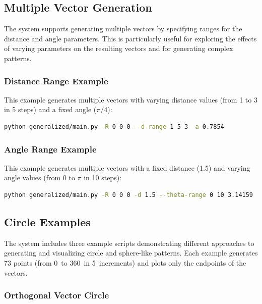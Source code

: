 \subsection{Multiple Vector Generation}

The system supports generating multiple vectors by specifying ranges for the distance and angle parameters. This is particularly useful for exploring the effects of varying parameters on the resulting vectors and for generating complex patterns.

\subsubsection{Distance Range Example}

This example generates multiple vectors with varying distance values (from 1 to 3 in 5 steps) and a fixed angle ($\pi/4$):

\begin{lstlisting}[language=bash]
python generalized/main.py -R 0 0 0 --d-range 1 5 3 -a 0.7854
\end{lstlisting}

\subsubsection{Angle Range Example}

This example generates multiple vectors with a fixed distance (1.5) and varying angle values (from 0 to $\pi$ in 10 steps):

\begin{lstlisting}[language=bash]
python generalized/main.py -R 0 0 0 -d 1.5 --theta-range 0 10 3.14159
\end{lstlisting}

\subsection{Circle Examples}

The system includes three example scripts demonstrating different approaches to generating and visualizing circle and sphere-like patterns. Each example generates 73 points (from 0\textdegree\ to 360\textdegree\ in 5\textdegree\ increments) and plots only the endpoints of the vectors.

\subsubsection{Orthogonal Vector Circle}

